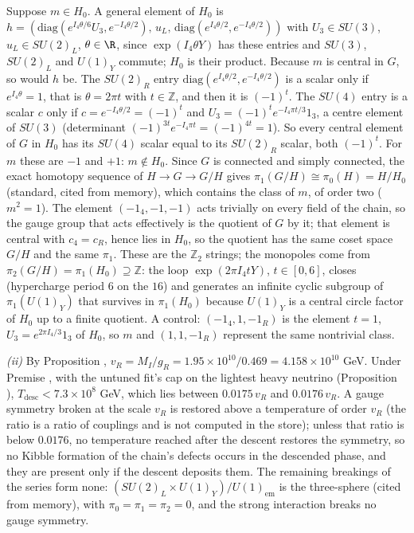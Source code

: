 Suppose $m \in H_{0}$. A general element of $H_{0}$ is $h = (\mathrm{diag}(e^{I_{4}\theta/6}U_{3}, e^{-I_{4}\theta/2}),\, u_{L},\, \mathrm{diag}(e^{I_{4}\theta/2}, e^{-I_{4}\theta/2}))$ with $U_{3} \in SU(3)$, $u_{L} \in SU(2)_{L}$, $\theta \in \R$, since $\exp(I_{4}\theta Y)$ has these entries and $SU(3)$, $SU(2)_{L}$ and $U(1)_{Y}$ commute; $H_{0}$ is their product. Because $m$ is central in $G$, so would $h$ be. The $SU(2)_{R}$ entry $\mathrm{diag}(e^{I_{4}\theta/2}, e^{-I_{4}\theta/2})$ is a scalar only if $e^{I_{4}\theta} = 1$, that is $\theta = 2\pi t$ with $t \in \mathbb{Z}$, and then it is $(-1)^{t}$. The $SU(4)$ entry is a scalar $c$ only if $c = e^{-I_{4}\theta/2} = (-1)^{t}$ and $U_{3} = (-1)^{t}e^{-I_{4}\pi t/3}1_{3}$, a centre element of $SU(3)$ (determinant $(-1)^{3t}e^{-I_{4}\pi t} = (-1)^{4t} = 1$). So every central element of $G$ in $H_{0}$ has its $SU(4)$ scalar equal to its $SU(2)_{R}$ scalar, both $(-1)^{t}$. For $m$ these are $-1$ and $+1$: $m \notin H_{0}$. Since $G$ is connected and simply connected, the exact homotopy sequence of $H \to G \to G/H$ gives $\pi_{1}(G/H) \cong \pi_{0}(H) = H/H_{0}$ (standard, cited from memory), which contains the class of $m$, of order two ($m^{2} = 1$). The element $(-1_{4}, -1, -1)$ acts trivially on every field of the chain, so the gauge group that acts effectively is the quotient of $G$ by it; that element is central with $c_{4} = c_{R}$, hence lies in $H_{0}$, so the quotient has the same coset space $G/H$ and the same $\pi_{1}$. These are the $\mathbb{Z}_{2}$ strings; the monopoles come from $\pi_{2}(G/H) = \pi_{1}(H_{0}) \supseteq \mathbb{Z}$: the loop $\exp(2\pi I_{4}t Y)$, $t \in [0, 6]$, closes (hypercharge period $6$ on the $16$) and generates an infinite cyclic subgroup of $\pi_{1}(U(1)_{Y})$ that survives in $\pi_{1}(H_{0})$ because $U(1)_{Y}$ is a central circle factor of $H_{0}$ up to a finite quotient. A control: $(-1_{4}, 1, -1_{R})$ is the element $t = 1$, $U_{3} = e^{2\pi I_{4}/3}1_{3}$ of $H_{0}$, so $m$ and $(1, 1, -1_{R})$ represent the same nontrivial class.

\emph{(ii)} By Proposition , $v_{R} = M_{I}/g_{R} = 1.95 \times 10^{10}/0.469 = 4.158 \times 10^{10}$ GeV. Under Premise , with the untuned fit's cap on the lightest heavy neutrino (Proposition ), $T_{\mathrm{desc}} < 7.3 \times 10^{8}$ GeV, which lies between $0.0175\,v_{R}$ and $0.0176\,v_{R}$. A gauge symmetry broken at the scale $v_{R}$ is restored above a temperature of order $v_{R}$ (the ratio is a ratio of couplings and is not computed in the store); unless that ratio is below $0.0176$, no temperature reached after the descent restores the symmetry, so no Kibble formation of the chain's defects occurs in the descended phase, and they are present only if the descent deposits them. The remaining breakings of the series form none: $(SU(2)_{L} \times U(1)_{Y})/U(1)_{\mathrm{em}}$ is the three-sphere (cited from memory), with $\pi_{0} = \pi_{1} = \pi_{2} = 0$, and the strong interaction breaks no gauge symmetry.


